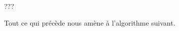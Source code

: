 ???








\medskip

Tout ce qui précède nous amène à l'algorithme suivant.

{\small
\begin{algo}[frame] \label{algo-kill}
	\BlankLine
\end{algo}
}